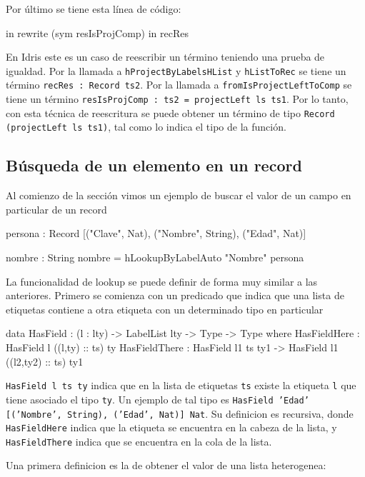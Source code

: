 Por último se tiene esta línea de código:

\begin{code}
in rewrite (sym resIsProjComp) in recRes
\end{code}

En Idris este es un caso de reescribir un término teniendo una prueba de igualdad. Por la llamada a \texttt{hProjectByLabelsHList} y \texttt{hListToRec} se tiene un término \texttt{recRes : Record ts2}. Por la llamada a \texttt{fromIsProjectLeftToComp} se tiene un término \texttt{resIsProjComp : ts2 = projectLeft ls ts1}. Por lo tanto, con esta técnica de reescritura se puede obtener un término de tipo \texttt{Record (projectLeft ls ts1)}, tal como lo indica el tipo de la función.

\subsection{Búsqueda de un elemento en un record}

Al comienzo de la sección vimos un ejemplo de buscar el valor de un campo en particular de un record

\begin{code}
persona : Record [("Clave", Nat), ("Nombre", String), 
  ("Edad", Nat)]

nombre : String
nombre = hLookupByLabelAuto "Nombre" persona
\end{code}

La funcionalidad de lookup se puede definir de forma muy similar a las anteriores. Primero se comienza con un predicado que indica que una lista de etiquetas contiene a otra etiqueta con un determinado tipo en particular

\begin{code}
data HasField : (l : lty) -> LabelList lty -> 
  Type -> Type where
  HasFieldHere : HasField l ((l,ty) :: ts) ty
  HasFieldThere : HasField l1 ts ty1 -> 
    HasField l1 ((l2,ty2) :: ts) ty1
\end{code}

\texttt{HasField l ts ty} indica que en la lista de etiquetas \texttt{ts} existe la etiqueta \texttt{l} que tiene asociado el tipo \texttt{ty}. Un ejemplo de tal tipo es \texttt{HasField 'Edad' [('Nombre', String), ('Edad', Nat)] Nat}. Su definicion es recursiva, donde \texttt{HasFieldHere} indica que la etiqueta se encuentra en la cabeza de la lista, y \texttt{HasFieldThere} indica que se encuentra en la cola de la lista.

Una primera definicion es la de obtener el valor de una lista heterogenea:


